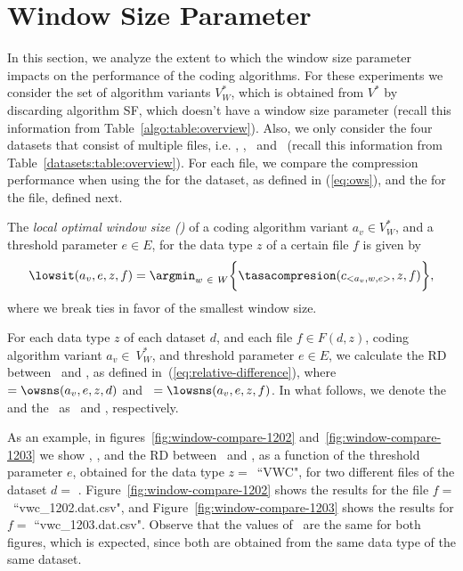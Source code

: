 
\clearpage
\section{Window Size Parameter}
\label{secX:windows}


In this section, we analyze the extent to which the window size parameter impacts on the performance of the coding algorithms. For these experiments we consider the set of algorithm variants $V^{*}_{W}$, which is obtained from $V^*$ by discarding algorithm SF, which doesn't have a window size parameter (recall this information from Table~\ref{algo:table:overview}). Also, we only consider the four datasets that consist of multiple files, i.e. \datasetirkis, \datasetsst, \datasetadcp \ and \datasetsolar\ (recall this information from Table~\ref{datasets:table:overview}). For each file, we compare the compression performance when using the \ows for the dataset, as defined in (\ref{eq:ows}), and the \lows for the file, defined next.


\begin{defcion}
The \textit{local optimal window size (\lowsit)} of a coding algorithm variant $a_v \in V^{*}_{W}$, and a threshold parameter $e \in E$, for the data type $z$ of a certain file $f$ is given by
\begin{equation}
\lowsit(a_v, e, z, f) = \argmin_{w\ \in \ W} \biggl\{ \tasacompresion(c_{<a_v, w, e>}, z, f) \biggr\},
\end{equation}
where we break ties in favor of the smallest window size.
\end{defcion}


For each data type $z$ of each dataset $d$, and each file $f \in F(d, z)$, coding algorithm variant $a_v \in~V^{*}_{W}$, and threshold parameter $e \in E$, we calculate the RD between \globalCAI\ and \localCAI, as defined in~(\ref{eq:relative-difference}), where \WGlobal\ $=\owsns(a_v, e, z, d)$ and \WLocal\ $=\lowsns(a_v, e, z, f)$. In what follows, we denote the \ows and the \lows\ as \WGlobal\ and \WLocal, respectively.


As an example, in figures~\ref{fig:window-compare-1202} and~\ref{fig:window-compare-1203} we show \WGlobal, \WLocal, and the RD between \globalCAI\ and \localCAI, as a function of the threshold parameter $e$, obtained for the data type $z=$~``VWC", for two different files of the dataset $d=$ \datasetirkis. Figure~\ref{fig:window-compare-1202} shows the results for the file $f=$~``vwc\_1202.dat.csv", and Figure~\ref{fig:window-compare-1203} shows the results for $f=$ ``vwc\_1203.dat.csv". Observe that the values of \WGlobal\ are the same for both figures, which is expected, since both are obtained from the same data type of the same dataset.


